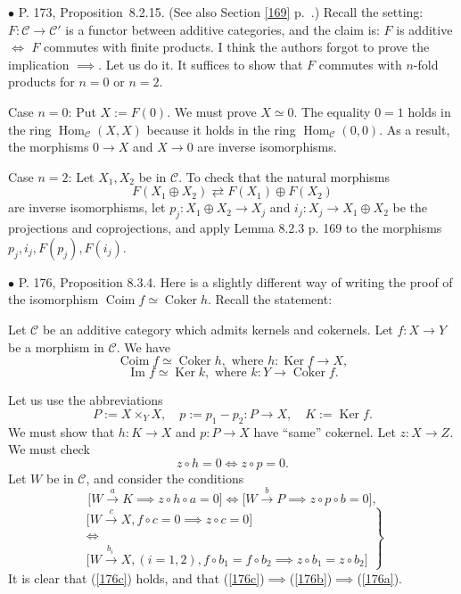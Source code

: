 \documentclass[12pt]{article}
\theoremstyle{remark}%
\newcommand{\bu}{\bullet}
\newcommand{\n}{\noindent}
\newcommand{\C}{\mathcal C}
\newcommand{\be}{\begin{equation}}
\newcommand{\ee}{\end{equation}}
\newcommand{\pr}{Proposition}
\DeclareMathOperator{\Coim}{Coim}
\DeclareMathOperator{\Coker}{Coker}
\DeclareMathOperator{\Ima}{Im}
\DeclareMathOperator{\Hom}{Hom}
\DeclareMathOperator{\Ker}{Ker}
\begin{document}

\n$\bu$ P. 173, \pr\ 8.2.15. (See also Section \ref{169} p.~\pageref{169}.) Recall the setting: $F:\C\to\C'$ is a functor between additive categories, and the claim is: $F$ is additive $\iff$ $F$ commutes with finite products. I think the authors forgot to prove the implication $\implies$. Let us do it. It suffices to show that $F$ commutes with $n$-fold products for $n=0$ or $n=2$. 

Case $n=0$: Put $X:=F(0)$. We must prove $X\simeq 0$. The equality $0=1$ holds in the ring $\Hom_\C(X,X)$ because it holds in the ring $\Hom_\C(0,0)$. As a result, the morphisms $0\to X$ and $X\to 0$ are inverse isomorphisms. 

Case $n=2$: Let $X_1,X_2$ be in $\C$. To check that the natural morphisms 
%
\be\label{173} 
F(X_1\oplus X_2)\rightleftarrows F(X_1)\oplus F(X_2)
\ee 
% 
are inverse isomorphisms, let $p_j:X_1\oplus X_2\to X_j$ and $i_j:X_j\to X_1\oplus X_2$ be the projections and coprojections, and apply Lemma 8.2.3 p. 169 to the morphisms $p_j,i_j,F(p_j),F(i_j)$. 


\n$\bu$ P. 176, Proposition 8.3.4. Here is a slightly different way of writing the proof of the isomorphism $\Coim f\simeq\Coker h$. Recall the statement: 

Let $\C$ be an additive category which admits kernels and cokernels. Let $f:X\to Y$ be a morphism in $\C$. We have 
$$ 
\Coim f\simeq\Coker h,\text{ where }h:\Ker f\to X, 
$$ 
$$ 
\Ima f\simeq\Ker k,\text{ where }k:Y\to\Coker f.  
$$ 

Let us use the abbreviations 
$$
P:=X\times_YX,\quad p:=p_1-p_2:P\to X,\quad K:=\Ker f.
$$
We must show that $h:K\to X$ and $p:P\to X$ have ``same'' cokernel. Let $z:X\to Z$. We must check 
%
\begin{equation}\label{176a}
z\circ h=0\iff z\circ p=0.
\end{equation}
%
Let $W$ be in $\C$, and consider the conditions 
%
\begin{equation}\label{176b}
\Big[W\overset{a}{\to}K\implies z\circ h\circ a=0\Big]\iff\Big[W\overset{b}{\to}P\implies z\circ p\circ b=0\Big],
\end{equation}
%
\begin{equation}\label{176c}
\left.
\begin{matrix}
\Big[W\overset{c}{\to}X,f\circ c=0\implies z\circ c=0\Big]\\ 
\iff\\ 
\Big[W\overset{b_i\ }{\to}X,(i=1,2),f\circ b_1=f\circ b_2\implies z\circ b_1=z\circ b_2\Big]
\end{matrix}
\right\}
\end{equation}
It is clear that (\ref{176c}) holds, and that (\ref{176c})$\implies$(\ref{176b})$\implies$(\ref{176a}).
\end{document}
